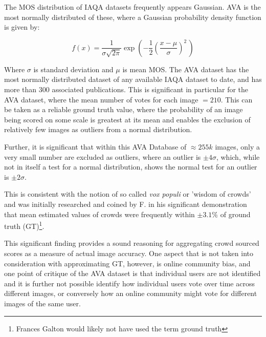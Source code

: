  The MOS distribution of IAQA datasets frequently appears Gaussian\cite{Murray2012, Datta2008, Yang2019, Talebi2018}. AVA is the most normally distributed of these\cite{Murray2012}, where a Gaussian probability density function is given by:

\begin{equation}\label{Gaussian PDF}
f(x) = \frac{1}{\sigma\sqrt{2\pi}} 
  \exp\left( -\frac{1}{2}\left(\frac{x-\mu}{\sigma}\right)^{\!2}\,\right)
\end{equation}



Where $\sigma$ is standard deviation and $\mu$ is mean MOS. The AVA dataset has the most normally distributed dataset of any available IAQA dataset to date\cite{Murray2012}, and has more than 300\cite{AVA2012} associated publications. This is significant in particular for the AVA dataset, where the mean number of votes for each image $ = 210$. This can be taken as a reliable ground truth value, where the probability of an image being scored on some scale is greatest at its mean and enables the exclusion of relatively few images as outliers from a normal distribution. 

Further, it is significant that within this AVA Database of $\approx 255k$ images, only a very small number are excluded as outliers, where an outlier is $\pm4\sigma$, which, while not in itself a test for a normal distribution, shows the normal test for an outlier is $\pm2\sigma$. \par 

This is  consistent with the notion of so called \textit{vox populi} or 'wisdom of crowds' and was initially researched and coined by F. \citeauthor{Galton1907}\cite{Galton1907} in his significant demonstration that mean estimated values of crowds were frequently within $\pm3.1\%$ of ground truth (GT)\footnote{Frances Galton would likely not have used the term ground truth}. 

This significant finding provides a sound reasoning for aggregating crowd sourced scores as a measure of actual image accuracy. One aspect that is not taken into consideration with approximating GT, however, is online community bias, and one point of critique of the AVA dataset is that individual users are not identified and it is further not possible identify how individual users vote over time across different images, or conversely how an online community might vote for different images of the same user.\par 

